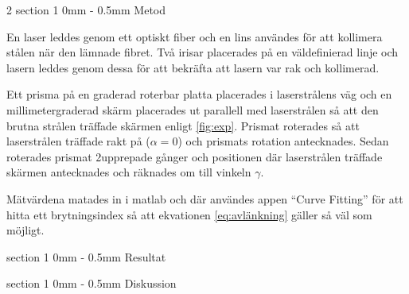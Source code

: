 \documentclass[a4paper]{article}
\makeatletter
\renewcommand{\section}{\@startsection
{section}%
{1}%
{0mm}%
{-\baselineskip}%
{0.5mm}%
{\normalfont\bfseries}} %
\makeatother
\begin{document}
\begin{multicols}{2}
  \section{Metod}
  
  
  En laser leddes genom ett optiskt fiber och en lins användes för att kollimera stålen när den lämnade fibret. Två irisar placerades på en väldefinierad linje och lasern leddes genom dessa för att bekräfta att lasern var rak och kollimerad.
  
  Ett prisma på en graderad roterbar platta placerades i laserstrålens väg och en millimetergraderad skärm placerades ut parallell med laserstrålen så att den brutna strålen träffade skärmen enligt \autoref{fig:exp}. Prismat roterades så att laserstrålen träffade rakt på ($\alpha=0$) och prismats rotation antecknades. Sedan roterades prismat 2\textdegree upprepade gånger och positionen där laserstrålen träffade skärmen antecknades och räknades om till vinkeln $\gamma$.
  
  Mätvärdena matades in i matlab och där användes appen ``Curve Fitting'' för att hitta ett brytningsindex så att ekvationen \eqref{eq:avlänkning} gäller så väl som möjligt.

  \section{Resultat}


  \section{Diskussion}


\end{multicols}
\end{document}
